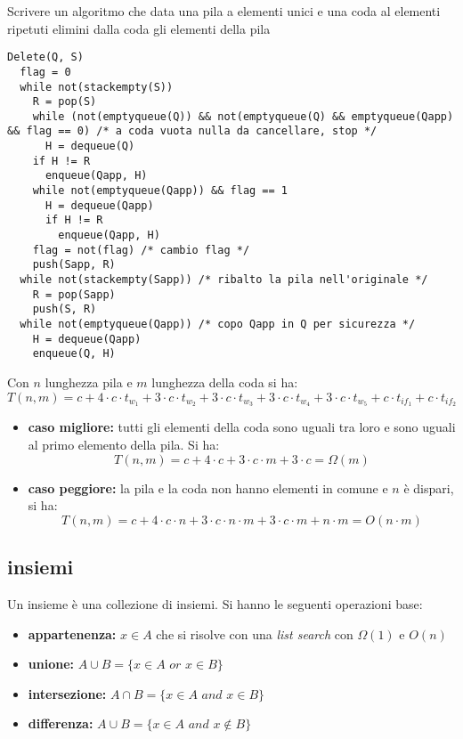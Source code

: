 \documentclass[a4paper,12pt,oneside,tikz]{book}
\begin{document}
\newpage
\begin{esercizio}
Scrivere un algoritmo che data una pila a elementi unici e una coda al elementi ripetuti elimini dalla coda gli elementi della pila
\begin{verbatim}
Delete(Q, S)
  flag = 0
  while not(stackempty(S))
    R = pop(S)
    while (not(emptyqueue(Q)) && not(emptyqueue(Q) && emptyqueue(Qapp)
&& flag == 0) /* a coda vuota nulla da cancellare, stop */
      H = dequeue(Q)
    if H != R 
      enqueue(Qapp, H)
    while not(emptyqueue(Qapp)) && flag == 1
      H = dequeue(Qapp)
      if H != R
        enqueue(Qapp, H)
    flag = not(flag) /* cambio flag */
    push(Sapp, R)
  while not(stackempty(Sapp)) /* ribalto la pila nell'originale */
    R = pop(Sapp)
    push(S, R)
  while not(emptyqueue(Qapp)) /* copo Qapp in Q per sicurezza */
    H = dequeue(Qapp)
    enqueue(Q, H)
\end{verbatim}
Con $n$ lunghezza pila e $m$ lunghezza della coda si ha:
$$T(n,m)=c+4\cdot c\cdot t_{w_1}+3\cdot c\cdot t_{w_2}+3\cdot c \cdot t_{w_3}+3\cdot c\cdot t_{w_4}+3\cdot c\cdot t_{w_5}+c\cdot t_{if_1}+c\cdot t_{if_2}$$
\begin{itemize}
\item \textbf{caso migliore:} tutti gli elementi della coda sono uguali tra loro e sono uguali al primo elemento della pila. Si ha:
$$T(n,m)=c+4\cdot c+3\cdot c\cdot m+3\cdot c=\Omega(m)$$
\item \textbf{caso peggiore:} la pila e la coda non hanno elementi in comune e $n$ è dispari, si ha:
$$T(n,m)=c+4\cdot c\cdot n+3\cdot c\cdot n\cdot m+3\cdot c\cdot m+n\cdot m=O(n\cdot m)$$
\end{itemize}
\end{esercizio}
\newpage
\subsection{insiemi}
Un insieme è una collezione di insiemi. Si hanno le seguenti operazioni base:
\begin{itemize}
\item \textbf{appartenenza:} $x\in A$ che si risolve con una \textit{list search} con $\Omega(1)$ e $O(n)$
\item \textbf{unione:} $A\cup B=\{x\in A\,\, or\,\, x\in B\}$
\item \textbf{intersezione:} $A\cap B=\{x\in A\,\, and\,\, x\in B\}$
\item \textbf{differenza:} $A\cup B=\{x\in A\,\, and\,\, x\not\in B\}$
\end{itemize}
\end{document}
